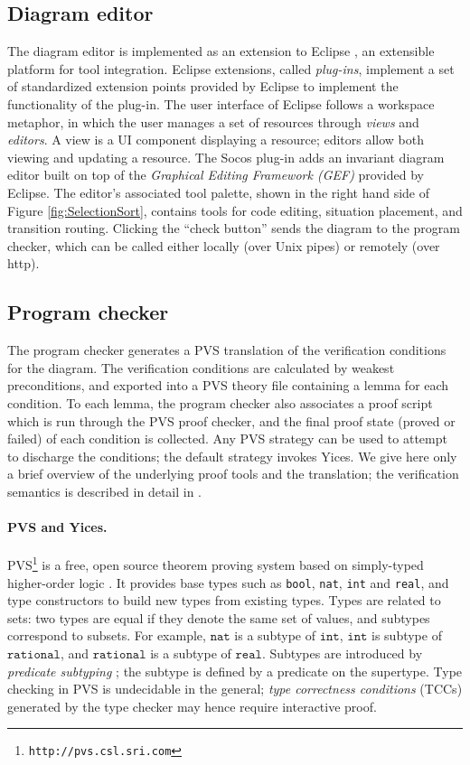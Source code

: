 \documentclass[english,submission]{eptcs}
\begin{document}
\subsection{Diagram editor}

The diagram editor is implemented as an extension to Eclipse
\cite{eclipse}, an extensible platform for tool integration. Eclipse
extensions, called \emph{plug-ins}, implement a set of standardized
extension points provided by Eclipse to implement the functionality of
the plug-in.  The user interface of Eclipse follows a workspace
metaphor, in which the user manages a set of resources through
\emph{views }and \emph{editors}.  A view is a UI component displaying
a resource; editors allow both viewing and updating a resource.  The
Socos plug-in adds an invariant diagram editor built on top of the
\emph{Graphical Editing Framework (GEF)} provided by Eclipse. The
editor's associated tool palette, shown in the right hand side of
Figure \ref{fig:SelectionSort}, contains tools for code editing,
situation placement, and transition routing. Clicking the {}``check
button'' sends the diagram to the program checker, which can be
called either locally (over Unix pipes) or remotely (over http).


\subsection{Program checker}

The program checker generates a PVS translation of the verification
conditions for the diagram. The verification conditions are
calculated by weakest preconditions, and exported into a PVS theory
file containing a lemma for each condition. To each lemma, the program
checker also associates a proof script which is run through the PVS
proof checker, and the final proof state (proved or failed) of each
condition is collected. Any PVS strategy can be used to attempt to
discharge the conditions; the default strategy invokes Yices. We give
here only a brief overview of the underlying proof tools and the translation;
the verification semantics is described in detail in \cite{inpErBa10}.


\paragraph{PVS and Yices.}

PVS\footnote{\texttt{http://pvs.csl.sri.com}} is a free, open source theorem proving system based on simply-typed
higher-order logic \cite{PVS-Semantics:TR}. It provides base types
such as \texttt{bool}, \texttt{nat}, \texttt{int} and \texttt{real},
and type constructors to build new types from existing types. Types
are related to sets: two types are equal if they denote the same set
of values, and subtypes correspond to subsets. For example, $\mathtt{nat}$
is a subtype of $\mathtt{int}$, $\mathtt{int}$ is subtype of $\mathtt{rational}$,
and $\mathtt{rational}$ is a subtype of $\mathtt{real}$. Subtypes
are introduced by \emph{predicate subtyping} \cite{Rushby98:TSE};
the subtype is defined by a predicate on the supertype. Type checking
in PVS is undecidable in the general; \emph{type correctness conditions
}(TCCs) generated by the type checker may hence require interactive
proof.
\end{document}
